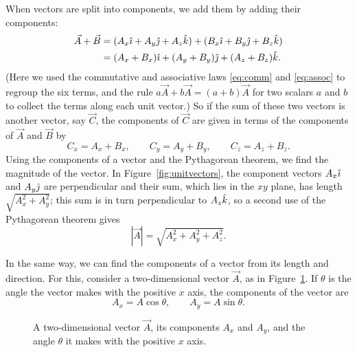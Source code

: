 \documentclass[11pt,a4paper]{article}
\begin{document}
When vectors are split into components, we add them by adding their components:
\begin{equation}\label{eq:addcomp}
\begin{aligned}
  \vec{A} + \vec{B} &= (A_x\hat{\imath} + A_y\hat{\jmath} + A_z\hat{k}) + (B_x\hat{\imath} + B_y\hat{\jmath} + B_z\hat{k}) \\
  &= (A_x + B_x)\hat{\imath} + (A_y + B_y)\hat{\jmath} + (A_z + B_z)\hat{k} .
\end{aligned}
\end{equation}
(Here we used the commutative and associative laws \eqref{eq:comm} and \eqref{eq:assoc} to
regroup the six terms, and the rule $a\vec{A} + b\vec{A} = (a+b)\vec{A}$ for two scalars $a$ and
$b$ to collect the terms along each unit vector.) So if the sum of these two vectors is another vector, say $\vec{C}$, the
components of $\vec{C}$ are given in terms of the components of $\vec{A}$ and $\vec{B}$ by
\begin{equation}\label{eq:Ccomp}
  C_x = A_x + B_x , \qquad C_y = A_y + B_y , \qquad C_z = A_z + B_z .
\end{equation}
Using the components of a vector and the Pythagorean theorem, we find the magnitude of the vector.
In Figure~\ref{fig:unitvectors}, the component vectors $A_x\hat{\imath}$ and $A_y\hat{\jmath}$ are perpendicular
and their sum, which lies in the $xy$ plane, has length $\sqrt{A_x^2 + A_y^2}$; this sum is in turn
perpendicular to $A_z\hat{k}$, so a second use of the Pythagorean theorem gives
\begin{equation}\label{eq:magnitude}
  |\vec{A}| = \sqrt{A_x^2 + A_y^2 + A_z^2} .
\end{equation}

In the same way, we can find the components of a vector from its length and direction. For this,
consider a two-dimensional vector $\vec{A}$, as in Figure~\ref{fig:2d}. If $\theta$ is the angle
the vector makes with the positive $x$ axis, the components of the vector are
\begin{equation}\label{eq:polar}
  A_x = A\cos\theta , \qquad A_y = A\sin\theta .
\end{equation}

\begin{figure}[htb]
\centering
{}
\caption{A two-dimensional vector $\vec{A}$, its components $A_x$ and $A_y$, and the angle
$\theta$ it makes with the positive $x$ axis.}
\label{fig:2d}
\end{figure}
\end{document}
